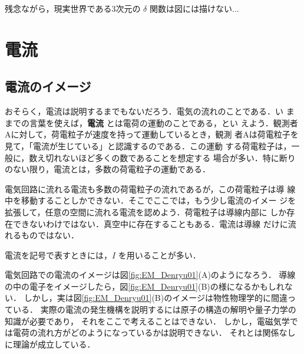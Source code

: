                         残念ながら，現実世界である3次元の $\delta$ 関数は図には描けない...

\section{電流}
    \subsection{電流のイメージ}
    おそらく，電流は説明するまでもないだろう．電気の流れのことである．い
    ままでの言葉を使えば，\textbf{電流} とは電荷の運動のことである，とい
    えよう．観測者Aに対して，荷電粒子が速度を持って運動しているとき，観測
    者Aは荷電粒子を見て，「電流が生じている」と認識するのである．この運動
    する荷電粒子は，一般に，数え切れないほど多くの数であることを想定する
    場合が多い．特に断りのない限り，電流とは，多数の荷電粒子の運動である．

    電気回路に流れる電流も多数の荷電粒子の流れであるが，この荷電粒子は導
    線中を移動することしかできない．そこでここでは，もう少し電流のイメー
    ジを拡張して，任意の空間に流れる電流を認めよう．荷電粒子は導線内部に
    しか存在できないわけではない．真空中に存在することもある．電流は導線
    だけに流れるものではない．

    電流を記号で表すときには，$I$ を用いることが多い．

    電気回路での電流のイメージは図\ref{fig:EM_Denryu01}(A)のようになろう．
    導線の中の電子をイメージしたら，図\ref{fig:EM_Denryu01}(B)の様になるかもしれない．
    しかし，実は図\ref{fig:EM_Denryu01}(B)のイメージは物性物理学的に間違っている．
    実際の電流の発生機構を説明するには原子の構造の解明や量子力学の知識が必要であり，
    それをここで考えることはできない．
    しかし，電磁気学では電荷の流れ方がどのようになっているかは説明できない．
    それとは関係なしに理論が成立している．


